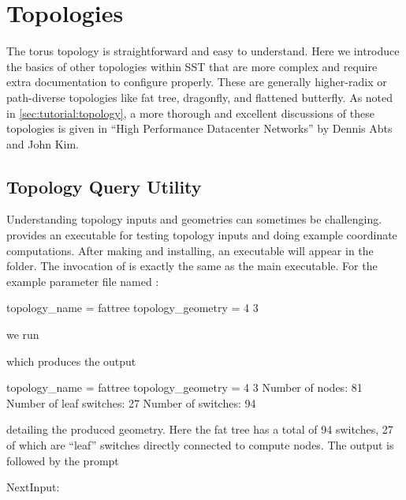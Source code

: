 
\chapter{Topologies}
\label{chapter:topologies}


The torus topology is straightforward and easy to understand.
Here we introduce the basics of other topologies within SST that are more complex and require extra documentation to configure properly.
These are generally higher-radix or path-diverse topologies like fat tree, dragonfly, and flattened butterfly.  
As noted in \ref{sec:tutorial:topology}, a more thorough and excellent discussions of these topologies is given in ``High Performance Datacenter Networks'' by Dennis Abts and John Kim.

\section{Topology Query Utility}
Understanding topology inputs and geometries can sometimes be challenging.
\sstmacro provides an executable for testing topology inputs and doing example coordinate computations.
After making and installing, an executable  will appear in the  folder.
The invocation of  is exactly the same as the main  executable.
For the example parameter file named :

\begin{ViFile}
topology_name = fattree
topology_geometry = 4 3
\end{ViFile}

we run

which produces the output

\begin{ViFile}
topology_name             = fattree
topology_geometry         = 4 3
Number of nodes:         81
Number of leaf switches: 27
Number of switches:      94
\end{ViFile}

detailing the produced geometry.  Here the fat tree has a total of 94 switches, 27 of which are ``leaf'' switches directly connected to compute nodes.
The output is followed by the prompt

\begin{ShellCmd}
NextInput: 
\end{ShellCmd}

